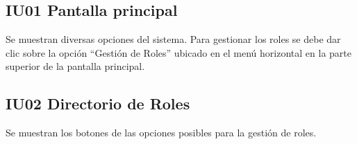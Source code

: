\newpage
\subsection{IU01 Pantalla principal}
	Se muestran diversas opciones del sistema. Para gestionar los roles se debe dar clic sobre la opción ``Gestión de Roles'' ubicado en el menú horizontal en la parte superior de la pantalla principal.

\subsection{IU02 Directorio de Roles}
Se muestran los botones de las opciones posibles para la gestión de roles.


%
%
%
%
%
%

